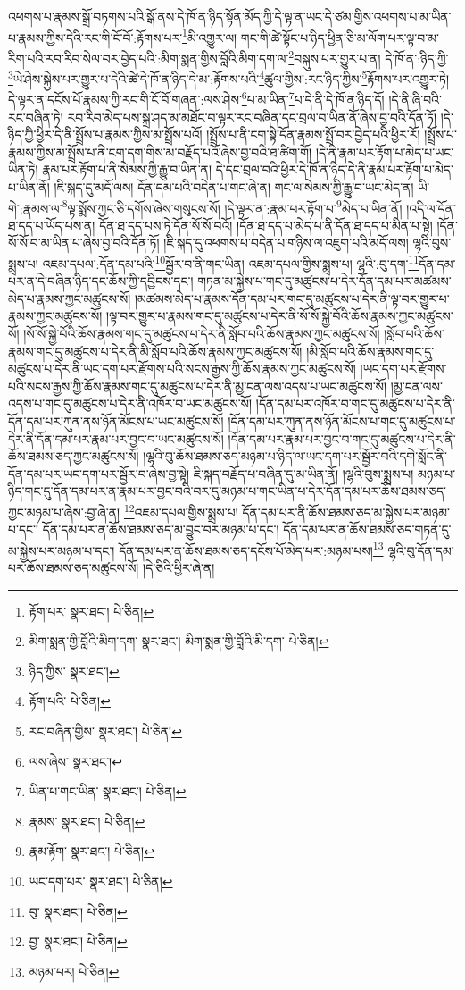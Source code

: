 འཕགས་པ་རྣམས་སྒྲོ་བཏགས་པའི་སྒོ་ནས་དེ་ཁོ་ན་ཉིད་སྟོན་མོད་ཀྱི་དེ་ལྟ་ན་ཡང་དེ་ཙམ་གྱིས་འཕགས་པ་མ་ཡིན་པ་རྣམས་ཀྱིས་དེའི་རང་གི་ངོ་བོ་:རྟོགས་པར་\footnote{རྟོག་པར་  སྣར་ཐང་།  པེ་ཅིན། }མི་འགྱུར་ལ། གང་གི་ཚེ་སྟོང་པ་ཉིད་ཕྱིན་ཅི་མ་ལོག་པར་ལྟ་བ་མ་རིག་པའི་རབ་རིབ་སེལ་བར་བྱེད་པའི་:མིག་སྨན་གྱིས་བློའི་མིག་དག་ལ་\footnote{མིག་སྨན་གྱི་བློའི་མིག་དག་  སྣར་ཐང་། མིག་སྨན་གྱི་བློའི་མི་དག་  པེ་ཅིན། }བསྐུས་པར་གྱུར་པ་ན། དེ་ཁོ་ན་:ཉིད་ཀྱི་\footnote{ཉིད་ཀྱིས་  སྣར་ཐང་། }ཡེ་ཤེས་སྐྱེས་པར་གྱུར་པ་དེའི་ཚེ་དེ་ཁོ་ན་ཉིད་དེ་མ་:རྟོགས་པའི་\footnote{རྟོག་པའི་  པེ་ཅིན། }ཚུལ་གྱིས་:རང་ཉིད་ཀྱིས་\footnote{རང་བཞིན་གྱིས་  སྣར་ཐང་།  པེ་ཅིན། }རྟོགས་པར་འགྱུར་ཏེ། དེ་ལྟར་ན་དངོས་པོ་རྣམས་ཀྱི་རང་གི་ངོ་བོ་གཞན་:ལས་ཤེས་\footnote{ལས་ཞེས་  སྣར་ཐང་། }པ་མ་ཡིན་\footnote{ཡིན་པ་གང་ཡིན་  སྣར་ཐང་།  པེ་ཅིན། }པ་དེ་ནི་དེ་ཁོ་ན་ཉིད་དོ། །དེ་ནི་ཞི་བའི་རང་བཞིན་ཏེ། རབ་རིབ་མེད་པས་སྐྲ་ཤད་མ་མཐོང་བ་ལྟར་རང་བཞིན་དང་བྲལ་བ་ཡིན་ནོ་ཞེས་བྱ་བའི་དོན་ཏོ། །དེ་ཉིད་ཀྱི་ཕྱིར་དེ་ནི་སྤྲོས་པ་རྣམས་ཀྱིས་མ་སྤྲོས་པའོ། །སྤྲོས་པ་ནི་ངག་སྟེ་དོན་རྣམས་སྤྲོ་བར་བྱེད་པའི་ཕྱིར་རོ། །སྤྲོས་པ་རྣམས་ཀྱིས་མ་སྤྲོས་པ་ནི་ངག་དག་གིས་མ་བརྗོད་པའོ་ཞེས་བྱ་བའི་ཐ་ཚིག་གོ། །དེ་ནི་རྣམ་པར་རྟོག་པ་མེད་པ་ཡང་ཡིན་ཏེ། རྣམ་པར་རྟོག་པ་ནི་སེམས་ཀྱི་རྒྱུ་བ་ཡིན་ན། དེ་དང་བྲལ་བའི་ཕྱིར་དེ་ཁོ་ན་ཉིད་དེ་ནི་རྣམ་པར་རྟོག་པ་མེད་པ་ཡིན་ནོ། །ཇི་སྐད་དུ་མདོ་ལས། དོན་དམ་པའི་བདེན་པ་གང་ཞེ་ན། གང་ལ་སེམས་ཀྱི་རྒྱུ་བ་ཡང་མེད་ན། ཡི་གེ་:རྣམས་ལ་\footnote{རྣམས་  སྣར་ཐང་།  པེ་ཅིན། }ལྟ་སྨོས་ཀྱང་ཅི་དགོས་ཞེས་གསུངས་སོ། །དེ་ལྟར་ན་:རྣམ་པར་རྟོག་པ་\footnote{རྣམ་རྟོག་  སྣར་ཐང་།  པེ་ཅིན། }མེད་པ་ཡིན་ནོ། །འདི་ལ་དོན་ཐ་དད་པ་ཡོད་པས་ན། དོན་ཐ་དད་པས་ཏེ་དོན་སོ་སོ་བའོ། །དོན་ཐ་དད་པ་མེད་པ་ནི་དོན་ཐ་དད་པ་མིན་པ་སྟེ། །དོན་སོ་སོ་བ་མ་ཡིན་པ་ཞེས་བྱ་བའི་དོན་ཏོ། །ཇི་སྐད་དུ་འཕགས་པ་བདེན་པ་གཉིས་ལ་འཇུག་པའི་མདོ་ལས། ལྷའི་བུས་སྨྲས་པ། འཇམ་དཔལ་:དོན་དམ་པའི་\footnote{ཡང་དག་པར་  སྣར་ཐང་།  པེ་ཅིན། }སྦྱོར་བ་ནི་གང་ཡིན། འཇམ་དཔལ་གྱིས་སྨྲས་པ། ལྷའི་:བུ་དག་\footnote{བུ་  སྣར་ཐང་།  པེ་ཅིན། }དོན་དམ་པར་ན་དེ་བཞིན་ཉིད་དང་ཆོས་ཀྱི་དབྱིངས་དང་། གཏན་མ་སྐྱེས་པ་གང་དུ་མཚུངས་པ་དེར་དོན་དམ་པར་མཚམས་མེད་པ་རྣམས་ཀྱང་མཚུངས་སོ། །མཚམས་མེད་པ་རྣམས་དོན་དམ་པར་གང་དུ་མཚུངས་པ་དེར་ནི་ལྟ་བར་གྱུར་པ་རྣམས་ཀྱང་མཚུངས་སོ། །ལྟ་བར་གྱུར་པ་རྣམས་གང་དུ་མཚུངས་པ་དེར་ནི་སོ་སོ་སྐྱེ་བོའི་ཆོས་རྣམས་ཀྱང་མཚུངས་སོ། །སོ་སོ་སྐྱེ་བོའི་ཆོས་རྣམས་གང་དུ་མཚུངས་པ་དེར་ནི་སློབ་པའི་ཆོས་རྣམས་ཀྱང་མཚུངས་སོ། །སློབ་པའི་ཆོས་རྣམས་གང་དུ་མཚུངས་པ་དེར་ནི་མི་སློབ་པའི་ཆོས་རྣམས་ཀྱང་མཚུངས་སོ། །མི་སློབ་པའི་ཆོས་རྣམས་གང་དུ་མཚུངས་པ་དེར་ནི་ཡང་དག་པར་རྫོགས་པའི་སངས་རྒྱས་ཀྱི་ཆོས་རྣམས་ཀྱང་མཚུངས་སོ། །ཡང་དག་པར་རྫོགས་པའི་སངས་རྒྱས་ཀྱི་ཆོས་རྣམས་གང་དུ་མཚུངས་པ་དེར་ནི་མྱ་ངན་ལས་འདས་པ་ཡང་མཚུངས་སོ། །མྱ་ངན་ལས་འདས་པ་གང་དུ་མཚུངས་པ་དེར་ནི་འཁོར་བ་ཡང་མཚུངས་སོ། །དོན་དམ་པར་འཁོར་བ་གང་དུ་མཚུངས་པ་དེར་ནི་དོན་དམ་པར་ཀུན་ནས་ཉོན་མོངས་པ་ཡང་མཚུངས་སོ། །དོན་དམ་པར་ཀུན་ནས་ཉོན་མོངས་པ་གང་དུ་མཚུངས་པ་དེར་ནི་དོན་དམ་པར་རྣམ་པར་བྱང་བ་ཡང་མཚུངས་སོ། །དོན་དམ་པར་རྣམ་པར་བྱང་བ་གང་དུ་མཚུངས་པ་དེར་ནི་ཆོས་ཐམས་ཅད་ཀྱང་མཚུངས་སོ། །ལྷའི་བུ་ཆོས་ཐམས་ཅད་མཉམ་པ་ཉིད་ལ་ཡང་དག་པར་སྦྱོར་བའི་དགེ་སློང་ནི་དོན་དམ་པར་ཡང་དག་པར་སྦྱོར་བ་ཞེས་བྱ་སྟེ། ཇི་སྐད་བརྗོད་པ་བཞིན་དུ་མ་ཡིན་ནོ། །ལྷའི་བུས་སྨྲས་པ། མཉམ་པ་ཉིད་གང་དུ་དོན་དམ་པར་ན་རྣམ་པར་བྱང་བའི་བར་དུ་མཉམ་པ་གང་ཡིན་པ་དེར་དོན་དམ་པར་ཆོས་ཐམས་ཅད་ཀྱང་མཉམ་པ་ཞེས་:བྱ་ཞེ་ན། \footnote{བྱ་  སྣར་ཐང་།  པེ་ཅིན། }འཇམ་དཔལ་གྱིས་སྨྲས་པ། དོན་དམ་པར་ནི་ཆོས་ཐམས་ཅད་མ་སྐྱེས་པར་མཉམ་པ་དང་། དོན་དམ་པར་ན་ཆོས་ཐམས་ཅད་མ་བྱུང་བར་མཉམ་པ་དང་། དོན་དམ་པར་ན་ཆོས་ཐམས་ཅད་གཏན་དུ་མ་སྐྱེས་པར་མཉམ་པ་དང་། དོན་དམ་པར་ན་ཆོས་ཐམས་ཅད་དངོས་པོ་མེད་པར་:མཉམ་པས།\footnote{མཉམ་པར།  པེ་ཅིན། } ལྷའི་བུ་དོན་དམ་པར་ཆོས་ཐམས་ཅད་མཚུངས་སོ། །དེ་ཅིའི་ཕྱིར་ཞེ་ན། 